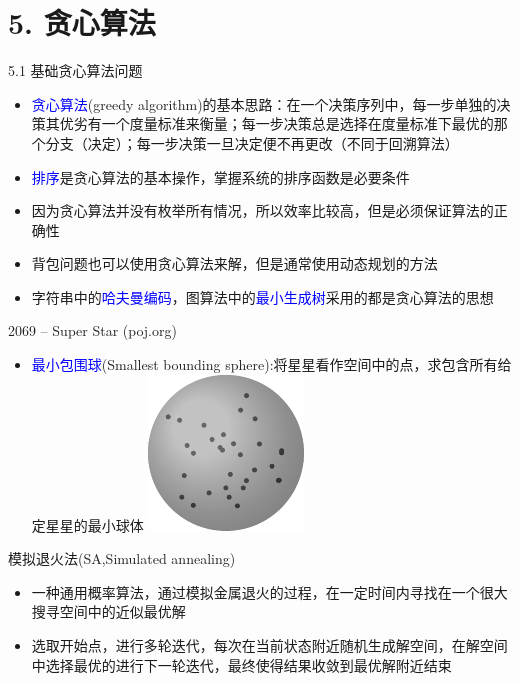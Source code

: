 


\frame{\titlepage}
\section{5. 贪心算法}
\begin{frame}{5.1 基础贪心算法问题}
    \begin{itemize}
        \item \textcolor{blue}{贪心算法}(greedy algorithm)的基本思路：在一个决策序列中，每一步单独的决策其优劣有一个度量标准来衡量；每一步决策总是选择在度量标准下最优的那个分支（决定）；每一步决策一旦决定便不再更改（不同于回溯算法）
        \item \textcolor{blue}{排序}是贪心算法的基本操作，掌握系统的排序函数是必要条件
        \item 因为贪心算法并没有枚举所有情况，所以效率比较高，但是必须保证算法的正确性
        \item 背包问题也可以使用贪心算法来解，但是通常使用动态规划的方法
        \item 字符串中的\textcolor{blue}{哈夫曼编码}，图算法中的\textcolor{blue}{最小生成树}采用的都是贪心算法的思想
    \end{itemize}
\end{frame}
\begin{frame}{2069 -- Super Star (poj.org)}
    \begin{itemize}
        \item \textcolor{blue}{最小包围球}(Smallest bounding sphere):将星星看作空间中的点，求包含所有给定星星的最小球体
        \includegraphics[center]{fig/5-1.pdf}
    \end{itemize}
    \begin{block}{模拟退火法(SA,Simulated annealing)}
        \begin{itemize}
            \item 一种通用概率算法，通过模拟金属退火的过程，在一定时间内寻找在一个很大搜寻空间中的近似最优解
            \item 选取开始点，进行多轮迭代，每次在当前状态附近随机生成解空间，在解空间中选择最优的进行下一轮迭代，最终使得结果收敛到最优解附近结束
        \end{itemize}
    \end{block}
\end{frame}

